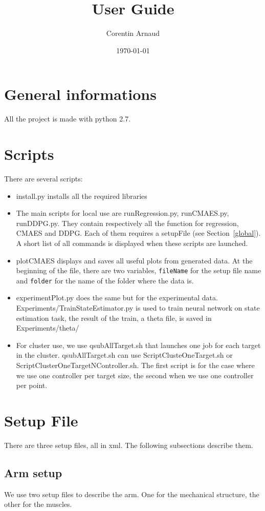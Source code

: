 \documentclass[a4paper]{article}
\title{User Guide}
\author{Corentin Arnaud}
\date{\today}
\begin{document}
\maketitle


\section{General informations}

All the project is made with python 2.7.

\section{Scripts}

There are several scripts:
\begin{itemize}
\item
install.py installs all the required libraries
\item
The main scripts for local use are runRegression.py, runCMAES.py, runDDPG.py. They contain respectively all the function for regression, CMAES and DDPG. 
Each of them requires a setupFile (see Section~\ref{global}). 
A short list of all commands is displayed when these scripts are launched.
\item
plotCMAES displays and saves all useful plots from generated data. 
At the beginning of the file, there are two variables, {\tt fileName} for the setup file name and {\tt folder} for the name of the folder where the data is. 
\item
experimentPlot.py does the same but for the experimental data.
Experiments/TrainStateEstimator.py is used to train neural network on state estimation task, the result of the train, a theta file, is saved in Experiments/theta/
\item
For cluster use, we use qsubAllTarget.sh that launches one job for each target in the cluster. qsubAllTarget.sh can use ScriptClusteOneTarget.sh or ScriptClusterOneTargetNController.sh. The first script is for the case where we use one controller per target size, the second when we use one controller per point.
\end{itemize}

\section{Setup File}
There are three setup files, all in xml. The following subsections describe them.
\subsection{Arm setup}
We use two setup files to describe the arm. One for the mechanical structure, the other for the muscles.
\end{document}
